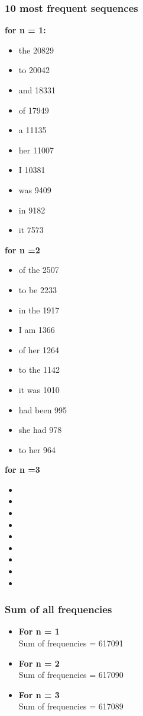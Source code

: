 \documentclass[final,12pt]{elsarticle}
\begin{document}
\subsubsection{10 most frequent sequences}
\textbf{for n = 1:}
\begin{itemize}
\item the 20829
\item to 20042
\item and 18331 
\item of 17949
\item a 11135
\item her 11007
\item I 10381
\item was 9409
\item in 9182 
\item it 7573
\end{itemize}
\textbf{for n =2}
\begin{itemize}
\item of the 2507
\item to be 2233
\item in the 1917
\item I am 1366
\item of her 1264
\item to the 1142
\item it was 1010
\item had been 995
\item she had 978
\item to her 964
\end{itemize}
\textbf{for n =3}
\begin{itemize}
\item 
\item
\item
\item
\item
\item
\item
\item
\item
\end{itemize}
\subsubsection{Sum of all frequencies}
\begin{itemize}
\item \textbf{For n = 1}\\
Sum of frequencies = 617091
\item \textbf{For n = 2}\\
Sum of frequencies = 617090
\item \textbf{For n = 3}\\
Sum of frequencies = 617089
\end{itemize}
\end{document}
